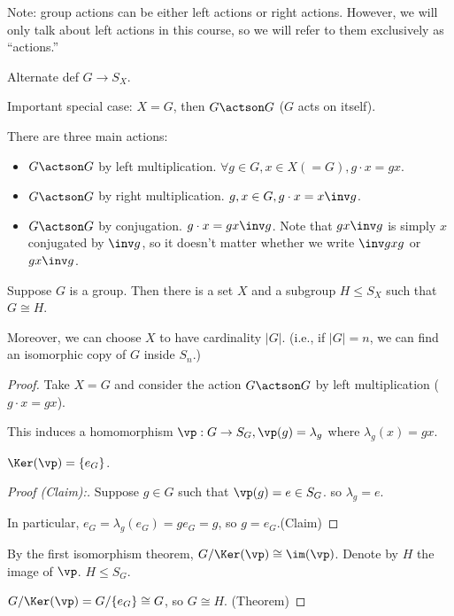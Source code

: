 \documentclass[notes.tex]{subfiles}
\begin{document}

Note: group actions can be either left actions or right actions. However, we will only talk about left actions in this course, so we will refer to them exclusively as ``actions.''


Alternate def $G\to S_X$.

Important special case: $X = G$, then $G\actson G$ ($G$ acts on itself).

There are three main actions:
\begin{itemize}
	\item $G\actson G$ by left multiplication.
	$\forall g\in G, x\in X (=G), g\cdot x = gx$.
	\item $G\actson G$ by right multiplication.
	$g, x\in G, g\cdot x = x\inv g$.
	\item $G\actson G$ by conjugation.
	$g\cdot x = g x \inv g$.
	Note that $gx\inv g$ is simply $x$ conjugated by $\inv g$, so it doesn't matter whether we write $\inv gxg$ or $gx\inv g$.
\end{itemize}

\begin{theorem}[Cayley]
	Suppose $G$ is a group. Then there is a set $X$ and a subgroup $H\le S_X$ such that $G\cong H$.

	Moreover, we can choose $X$ to have cardinality $|G|$. (i.e., if $|G| = n$, we can find an isomorphic copy of $G$ inside $S_n$.)
\end{theorem}


\begin{proof}
	Take $X = G$ and consider the action $G\actson G$ by left multiplication ($g\cdot x = gx$).

	This induces a homomorphism $\vp:G\to S_G, \vp(g) = \lambda_g$ where $\lambda_g(x) = gx$.
	\begin{claim}
		$\Ker(\vp) = \{e_G\}$.
	\end{claim}
	\begin{proof}[Proof (Claim):]
	Suppose $g\in G$ such that $\vp(g) = e \in S_G$. so $\lambda_g = e$. 

	In particular, $e_G = \lambda_g(e_G) = ge_G = g$, so $g = e_G$.\qedhere(Claim)
	\end{proof}
	By the first isomorphism theorem, $G/\Ker(\vp) \cong \im(\vp)$. Denote by $H$ the image of $\vp$. $H \le S_G$. 

	$G/\Ker(\vp) = G/\{e_G\} \cong G$, so $G\cong H$. \qedhere(Theorem)
\end{proof}
\end{document}
